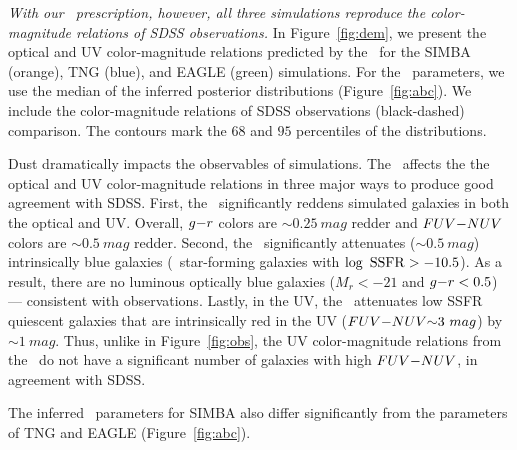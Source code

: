 \emph{With our \eda~prescription, however, all three simulations reproduce the
color-magnitude relations of SDSS observations.} In Figure~\ref{fig:dem}, 
we present the optical and UV color-magnitude relations predicted by the 
\eda~for the SIMBA (orange), TNG (blue), and EAGLE (green) simulations. 
For the \eda~parameters, we use the median of the inferred posterior distributions (Figure~\ref{fig:abc}). 
We include the color-magnitude
relations of SDSS observations (black-dashed) comparison. The contours mark 
the $68$ and $95$ percentiles of the distributions. 

Dust dramatically impacts the observables of simulations. The \eda~affects the 
the optical and UV color-magnitude relations in three major ways to produce
good agreement with SDSS. 
First, the \eda~significantly reddens simulated galaxies in both the optical
and UV. Overall, $g{-}r$ colors are ${\sim}0.25~mag$ redder and $FUV{-}NUV$ colors
are ${\sim}0.5~mag$ redder. 
Second, the \eda~significantly attenuates (${\sim}0.5~mag$) intrinsically blue
galaxies (\ie~star-forming galaxies with $\log~{\rm SSFR} > -10.5$). As a
result, there are no luminous optically blue galaxies ($M_r < -21$ and $g{-}r <
0.5$) --- consistent with observations.
Lastly, in the UV, the \eda~attenuates low SSFR quiescent galaxies that are 
intrinsically red in the UV ($FUV{-}NUV{\sim}3~mag$) by ${\sim}1~mag$. Thus, unlike in
Figure~\ref{fig:obs}, the UV color-magnitude relations from the \eda~do not
have a significant number of galaxies with high $FUV{-}NUV$, in agreement with SDSS.

The inferred \eda~parameters for SIMBA
also differ significantly from the parameters of TNG and EAGLE
(Figure~\ref{fig:abc}). 

